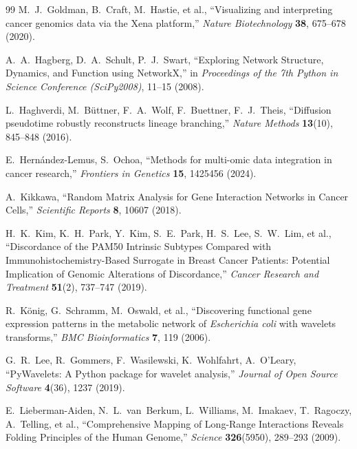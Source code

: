 \documentclass[11pt]{article}
\begin{document}
\begin{thebibliography}{99}
M.~J.~Goldman, B.~Craft, M.~Hastie, et al.,
\newblock ``Visualizing and interpreting cancer genomics data via the Xena platform,''
\newblock \emph{Nature Biotechnology} \textbf{38}, 675--678 (2020).

A.~A.~Hagberg, D.~A.~Schult, P.~J.~Swart,
\newblock ``Exploring Network Structure, Dynamics, and Function using NetworkX,''
\newblock in \emph{Proceedings of the 7th Python in Science Conference (SciPy2008)}, 11--15 (2008).

L.~Haghverdi, M.~B\"uttner, F.~A.~Wolf, F.~Buettner, F.~J.~Theis,
\newblock ``Diffusion pseudotime robustly reconstructs lineage branching,''
\newblock \emph{Nature Methods} \textbf{13}(10), 845--848 (2016).

E.~Hern\'andez-Lemus, S.~Ochoa,
\newblock ``Methods for multi-omic data integration in cancer research,''
\newblock \emph{Frontiers in Genetics} \textbf{15}, 1425456 (2024).

A.~Kikkawa,
\newblock ``Random Matrix Analysis for Gene Interaction Networks in Cancer Cells,''
\newblock \emph{Scientific Reports} \textbf{8}, 10607 (2018).

H.~K.~Kim, K.~H.~Park, Y.~Kim, S.~E.~Park, H.~S.~Lee, S.~W.~Lim, et al.,
\newblock ``Discordance of the PAM50 Intrinsic Subtypes Compared with Immunohistochemistry-Based Surrogate in Breast Cancer Patients: Potential Implication of Genomic Alterations of Discordance,''
\newblock \emph{Cancer Research and Treatment} \textbf{51}(2), 737--747 (2019).

R.~K\"onig, G.~Schramm, M.~Oswald, et al.,
\newblock ``Discovering functional gene expression patterns in the metabolic network of \emph{Escherichia coli} with wavelets transforms,''
\newblock \emph{BMC Bioinformatics} \textbf{7}, 119 (2006).

G.~R.~Lee, R.~Gommers, F.~Wasilewski, K.~Wohlfahrt, A.~O'Leary,
\newblock ``PyWavelets: A Python package for wavelet analysis,''
\newblock \emph{Journal of Open Source Software} \textbf{4}(36), 1237 (2019).

E.~Lieberman-Aiden, N.~L.~van~Berkum, L.~Williams, M.~Imakaev, T.~Ragoczy, A.~Telling, et al.,
\newblock ``Comprehensive Mapping of Long-Range Interactions Reveals Folding Principles of the Human Genome,''
\newblock \emph{Science} \textbf{326}(5950), 289--293 (2009).


\end{thebibliography}
\end{document}
